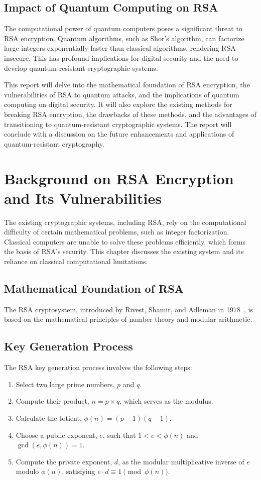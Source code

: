 \documentclass[12pt,a4paper]{report}
\begin{document}
\section{Impact of Quantum Computing on RSA}
The computational power of quantum computers poses a significant threat to RSA encryption. Quantum algorithms, such as Shor's algorithm, can factorize large integers exponentially faster than classical algorithms, rendering RSA insecure. This has profound implications for digital security and the need to develop quantum-resistant cryptographic systems.

This report will delve into the mathematical foundation of RSA encryption, the vulnerabilities of RSA to quantum attacks, and the implications of quantum computing on digital security. It will also explore the existing methods for breaking RSA encryption, the drawbacks of these methods, and the advantages of transitioning to quantum-resistant cryptographic systems. The report will conclude with a discussion on the future enhancements and applications of quantum-resistant cryptography.

\chapter{Background on RSA Encryption and Its Vulnerabilities}
The existing cryptographic systems, including RSA, rely on the computational difficulty of certain mathematical problems, such as integer factorization. Classical computers are unable to solve these problems efficiently, which forms the basis of RSA's security. This chapter discusses the existing system and its reliance on classical computational limitations.

\section{Mathematical Foundation of RSA}
The RSA cryptosystem, introduced by Rivest, Shamir, and Adleman in 1978~\cite{Rivest1978}, is based on the mathematical principles of number theory and modular arithmetic.

\section{Key Generation Process}
The RSA key generation process involves the following steps:
\begin{enumerate}
    \item Select two large prime numbers, \(p\) and \(q\).
    \item Compute their product, \(n = p \times q\), which serves as the modulus.
    \item Calculate the totient, \(\phi(n) = (p-1)(q-1)\).
    \item Choose a public exponent, \(e\), such that \(1 < e < \phi(n)\) and \(\gcd(e, \phi(n)) = 1\).
    \item Compute the private exponent, \(d\), as the modular multiplicative inverse of \(e\) modulo \(\phi(n)\), satisfying \(e \cdot d \equiv 1 \pmod{\phi(n)}\).
\end{enumerate}
\end{document}

